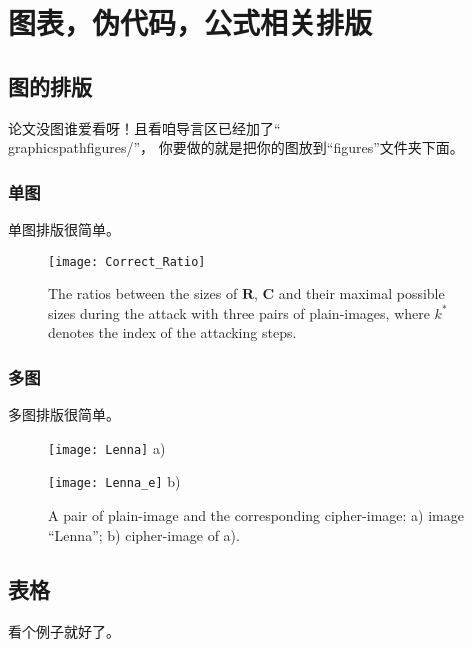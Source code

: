 \chapter{图表，伪代码，公式相关排版}\label{elements}

\section{图的排版}
论文没图谁爱看呀！且看咱导言区已经加了``\\graphicspath{{figures/}}''，
你要做的就是把你的图放到``figures''文件夹下面。

\subsection{单图}
单图排版很简单。

\begin{figure}[!htb]
\centering
\begin{minipage}[t]{\oneimage}
\centering
\texttt{[image: Correct\_Ratio]}
\end{minipage}
\caption{The ratios between the sizes of $\bm{R}$, $\bm{C}$ and their maximal possible sizes during the attack with three pairs of plain-images,
where $k^*$ denotes the index of the attacking steps.}
\label{fig:ratio}
\end{figure}

\subsection{多图}
多图排版很简单。

\begin{figure}[!htb]
\centering
\begin{minipage}[t]{\twoimage}
\centering
\texttt{[image: Lenna]}
a)
\end{minipage} \hspace{4pt}
\begin{minipage}[t]{\twoimage}
\centering
\texttt{[image: Lenna\_e]}
b)
\end{minipage}
\caption{A pair of plain-image and the corresponding cipher-image:
a) image ``Lenna''; b) cipher-image of a).}
\label{fig:APairPlaintext}
\end{figure}

\section{表格}
看个例子就好了。

